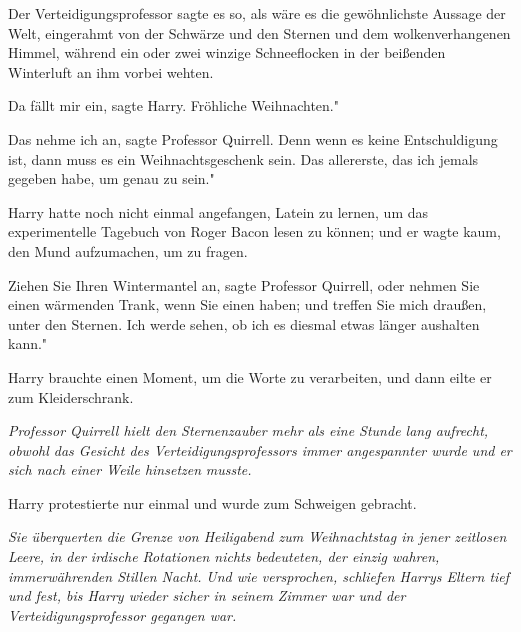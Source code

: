 Der Verteidigungsprofessor sagte es so, als wäre es die gewöhnlichste Aussage
der Welt, eingerahmt von der Schwärze und den Sternen und dem wolkenverhangenen
Himmel, während ein oder zwei winzige Schneeflocken in der beißenden Winterluft
an ihm vorbei wehten.

\glqq{}Da fällt mir ein\grqq{}, sagte Harry. \glqq{}Fröhliche Weihnachten."

\glqq{}Das nehme ich an\grqq{}, sagte Professor Quirrell. \glqq{}Denn wenn es
keine Entschuldigung ist, dann muss es ein Weihnachtsgeschenk sein. Das
allererste, das ich jemals gegeben habe, um genau zu sein."

Harry hatte noch nicht einmal angefangen, Latein zu lernen, um das
experimentelle Tagebuch von Roger Bacon lesen zu können; und er wagte kaum, den
Mund aufzumachen, um zu fragen.

\glqq{}Ziehen Sie Ihren Wintermantel an\grqq{}, sagte Professor Quirrell, \glqq{}
oder nehmen Sie einen wärmenden Trank, wenn Sie einen haben; und treffen Sie
mich draußen, unter den Sternen. Ich werde sehen, ob ich es diesmal etwas länger
aushalten kann."

Harry brauchte einen Moment, um die Worte zu verarbeiten, und dann eilte er zum
Kleiderschrank.

\emph{Professor Quirrell hielt den Sternenzauber mehr als eine Stunde lang
aufrecht, obwohl das Gesicht des Verteidigungsprofessors immer angespannter
wurde und er sich nach einer Weile hinsetzen} \emph{musste.}

Harry protestierte nur einmal und wurde zum Schweigen gebracht.

\emph{Sie überquerten die Grenze von Heiligabend zum Weihnachtstag in jener
zeitlosen Leere, in der irdische Rotationen nichts bedeuteten, der einzig
wahren, immerwährenden Stillen Nacht.}\emph{ Und wie versprochen, schliefen
Harrys Eltern tief und fest, bis Harry wieder sicher in seinem Zimmer war und
der Verteidigungsprofessor gegangen war.}

